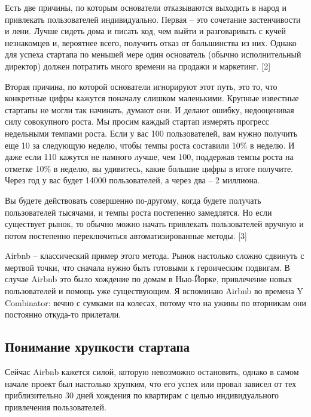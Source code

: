 \documentclass[ebook,12pt,oneside,openany]{memoir}
\begin{document}
Есть две причины, по которым основатели отказываются выходить в народ
и привлекать пользователей индивидуально. Первая – это сочетание
застенчивости и лени. Лучше сидеть дома и писать код, чем выйти и
разговаривать с кучей незнакомцев и, вероятнее всего, получить отказ
от большинства из них. Однако для успеха стартапа по меньшей мере один
основатель (обычно исполнительный директор) должен потратить много
времени на продажи и маркетинг. [2] \newline

Вторая причина, по которой основатели игнорируют этот путь, это то,
что конкретные цифры кажутся поначалу слишком маленькими. Крупные
известные стартапы не могли так начинать, думают они. И делают ошибку,
недооценивая силу совокупного роста. Мы просим каждый стартап измерять
прогресс недельными темпами роста. Если у вас 100 пользователей, вам
нужно получить еще 10 за следующую неделю, чтобы темпы роста составили
10\% в неделю. И даже если 110 кажутся не намного лучше, чем 100,
поддержав темпы роста на отметке 10\% в неделю, вы удивитесь, какие
большие цифры в итоге получите. Через год у вас будет 14000
пользователей, а через два – 2 миллиона. \newline

Вы будете действовать совершенно по-другому, когда будете получать
пользователей тысячами, и темпы роста постепенно замедлятся. Но если
существует рынок, то обычно можно начать привлекать пользователей
вручную и потом постепенно переключиться автоматизированные методы.
[3] \newline

Airbnb – классический пример этого метода. Рынок настолько сложно
сдвинуть с мертвой точки, что сначала нужно быть готовыми к
героическим подвигам. В случае Airbnb это было хождение по домам в
Нью-Йорке, привлечение новых пользователей и помощь уже существующим.
Я вспоминаю Airbnb во времена Y Combinator: вечно с сумками на
колесах, потому что на ужины по вторникам они постоянно откуда-то
прилетали. \newline

\subsection{Понимание хрупкости стартапа}

Сейчас Airbnb кажется силой, которую невозможно остановить, однако в
самом начале проект был настолько хрупким, что его успех или провал
зависел от тех приблизительно 30 дней хождения по квартирам с целью
индивидуального привлечения пользователей. \newline
\end{document}
